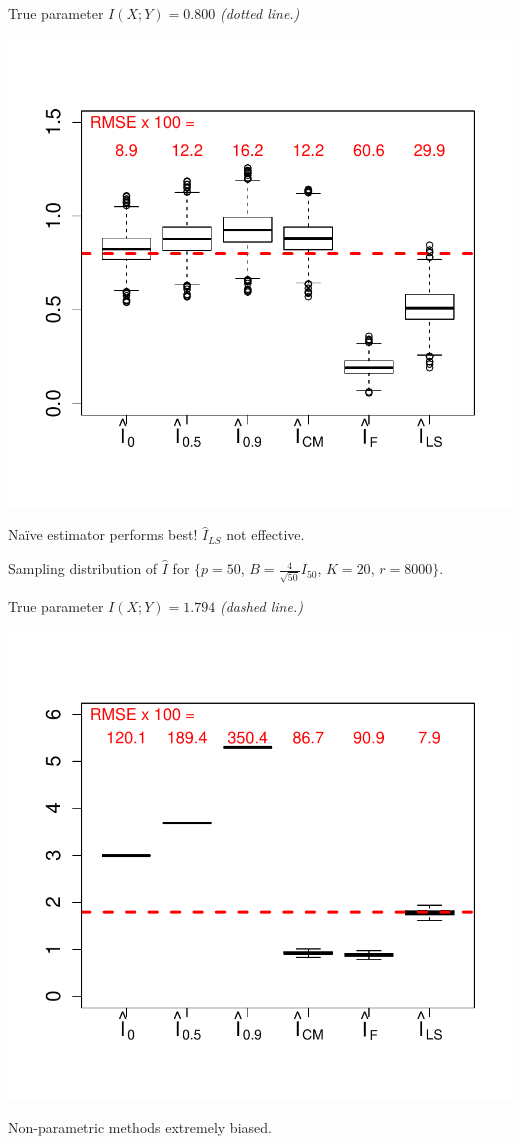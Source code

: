 \documentclass[12pt]{article}
\begin{document}
True parameter $I(X; Y) = 0.800$ \emph{(dotted line.)}
\begin{center}
\includegraphics[scale = 0.5, clip = true, trim = 0 0.5in 0 0.5in]{../info_theory_sims/fig1.pdf}
\end{center}
Na\"{i}ve estimator performs best!  $\hat{I}_{LS}$ not effective.

Sampling distribution of $\hat{I}$ for \small{$\{p = 50$, $B = \frac{4}{\sqrt{50}} I_{50}$, $K = 20$, $r = 8000\}$.}

True parameter $I(X; Y) = 1.794$ \emph{(dashed line.)}
\begin{center}
\includegraphics[scale = 0.5, clip = true, trim = 0 0.5in 0 0.5in]{../info_theory_sims/fig2.pdf}
\end{center}
Non-parametric methods extremely biased.
\end{document}
